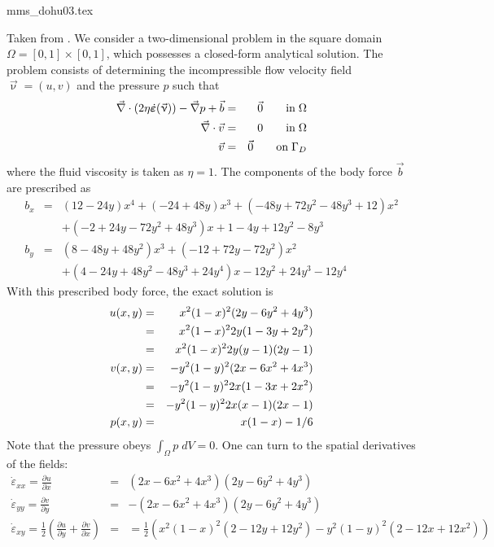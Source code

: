 \begin{flushright} {\tiny {\color{gray} mms\_dohu03.tex}} \end{flushright}

Taken from \cite{dohu03}. We consider a two-dimensional problem 
in the square domain $\Omega=[0,1]\times[0,1]$, which possesses a closed-form analytical 
solution. The problem consists of determining the incompressible flow velocity field ${\vec \upnu} = (u,v)$ 
and the pressure $p$ such that 
\begin{eqnarray}
\vec\nabla \cdot (2 \eta \dot{\bm \varepsilon}({\vec \upnu})) -{\vec \nabla} p + {\vec b} &=& \vec 0 \quad\quad {\rm in} \; \Omega\\
\vec{\nabla} \cdot \vec{v} &=& 0 \quad\quad {\rm in} \; \Omega\\
\vec{v}&=&\vec{0} \quad\quad {\rm on} \; \Gamma_D
\end{eqnarray}
where the fluid viscosity is taken as $\eta=1$.
The components of the body force $\vec{b}$ are prescribed as 
\begin{eqnarray}
b_x &=& (12 - 24y) x^4 + (-24 + 48y) x^3 + (-48y + 72y^2 - 48 y^3 + 12) x^2 \nonumber\\
    && + (-2 + 24y -72y^2+48y^3)x + 1-4y + 12y^2-8y^3 \nonumber\\ 
b_y &=& (8 - 48y + 48 y^2) x^3 + (-12 + 72y - 72y^2) x^2  \nonumber\\
    && + (4 - 24y + 48y^2 - 48y^3 + 24y^4) x - 12y^2 + 24y^3 - 12y^4  \nonumber
\end{eqnarray}
With this prescribed body force, the exact solution is 
\begin{eqnarray}
u(x,y) 
&=& x^2(1- x)^2 (2y - 6y^2 + 4y^3)  \nonumber\\
&=& x^2(1-x)^2 2y (1-3y+2y^2) \nonumber\\
&=& x^2(1-x)^2 2y (y-1)(2y-1) \nonumber\\
v(x,y) 
&=& -y^2 (1 - y)^2 (2x - 6x^2 + 4x^3) \nonumber\\
&=& -y^2 (1 - y)^2 2x (1-3x+2x^2) \nonumber\\
&=& -y^2 (1 - y)^2 2x (x-1)(2x-1) \nonumber\\
p(x,y) &=& x(1 -x)- 1/6 \nonumber 
\end{eqnarray}
Note that the pressure obeys $\int_{\Omega} p \; dV = 0$.
One can turn to the spatial derivatives of the fields:
\begin{eqnarray}
\dot{\varepsilon}_{xx}=\frac{\partial u}{\partial x} &=&  (2x -6x^2 +4 x^3 ) (2y - 6y^2 + 4y^3)  \\
\dot{\varepsilon}_{yy}=\frac{\partial v}{\partial y} &=&  - (2x -6x^2 +4 x^3 ) (2y - 6y^2 + 4y^3)  \\
\dot{\varepsilon}_{xy}=\frac{1}{2}\left(\frac{\partial u}{\partial y}+\frac{\partial v}{\partial x}\right) 
&=&=\frac{1}{2}\left( x^2(1- x)^2 ( 2-12y+12y^2  ) -y^2 (1-y)^2 (2-12x+12x^2) \right)
\end{eqnarray}
